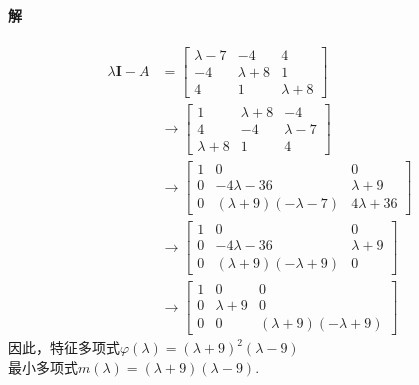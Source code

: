 \documentclass[12pt, a4paper, oneside, fontset=none]{ctexart}
\begin{document}
\paragraph*{解}
\begin{align*}
    \lambda\bm{I} - A & = \begin{bmatrix}
                              \lambda - 7 & -4          & 4           \\
                              -4          & \lambda + 8 & 1           \\
                              4           & 1           & \lambda + 8
                          \end{bmatrix}           \\
                      & \to \begin{bmatrix}
                                1           & \lambda + 8 & -4          \\
                                4           & -4          & \lambda - 7 \\
                                \lambda + 8 & 1           & 4
                            \end{bmatrix}         \\
                      & \to \begin{bmatrix}
                                1 & 0                           & 0             \\
                                0 & -4\lambda - 36              & \lambda + 9   \\
                                0 & (\lambda + 9)(-\lambda - 7) & 4\lambda + 36
                            \end{bmatrix} \\
                      & \to \begin{bmatrix}
                                1 & 0                           & 0           \\
                                0 & -4\lambda - 36              & \lambda + 9 \\
                                0 & (\lambda + 9)(-\lambda + 9) & 0
                            \end{bmatrix}   \\
                      & \to \begin{bmatrix}
                                1 & 0           & 0                           \\
                                0 & \lambda + 9 & 0                           \\
                                0 & 0           & (\lambda + 9)(-\lambda + 9)
                            \end{bmatrix}
\end{align*}
因此，特征多项式$\varphi(\lambda) = (\lambda + 9)^2(\lambda - 9)$ \\
最小多项式$m(\lambda) = (\lambda + 9)(\lambda - 9).$
\end{document}
